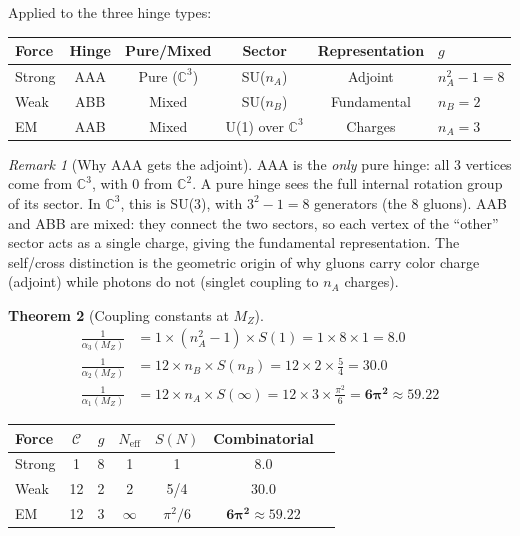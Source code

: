 \documentclass[12pt]{article}
\newtheorem{theorem}{Theorem}[section]
\theoremstyle{remark}
\newtheorem{remark}[theorem]{Remark}
\theoremstyle{definition}
\newcommand{\CC}{\mathbb{C}}
\begin{document}
Applied to the three hinge types:
\begin{center}
\begin{tabular}{lccccl}
\hline
Force & Hinge & Pure/Mixed & Sector & Representation & $g$ \\
\hline
Strong & AAA & Pure ($\CC^3$) & SU($n_A$) & Adjoint & $n_A^2 - 1 = 8$ \\
Weak & ABB & Mixed & SU($n_B$) & Fundamental & $n_B = 2$ \\
EM & AAB & Mixed & U(1) over $\CC^3$ & Charges & $n_A = 3$ \\
\hline
\end{tabular}
\end{center}

\begin{remark}[Why AAA gets the adjoint]
AAA is the \emph{only} pure hinge: all 3 vertices come from $\CC^3$, with 0 from $\CC^2$. A pure hinge sees the full internal rotation group of its sector. In $\CC^3$, this is SU(3), with $3^2 - 1 = 8$ generators (the 8 gluons). AAB and ABB are mixed: they connect the two sectors, so each vertex of the ``other'' sector acts as a single charge, giving the fundamental representation. The self/cross distinction is the geometric origin of why gluons carry color charge (adjoint) while photons do not (singlet coupling to $n_A$ charges).
\end{remark}

\begin{theorem}[Coupling constants at $M_Z$]
\label{thm:couplings}
\begin{align}
\frac{1}{\alpha_3(M_Z)} &= 1 \times (n_A^2 - 1) \times S(1) = 1 \times 8 \times 1 = \mathbf{8.0} \label{eq:alpha3} \\
\frac{1}{\alpha_2(M_Z)} &= 12 \times n_B \times S(n_B) = 12 \times 2 \times \frac{5}{4} = \mathbf{30.0} \label{eq:alpha2} \\
\frac{1}{\alpha_1(M_Z)} &= 12 \times n_A \times S(\infty) = 12 \times 3 \times \frac{\pi^2}{6} = \mathbf{6\pi^2} \approx 59.22 \label{eq:alpha1}
\end{align}
\end{theorem}

\begin{center}
\begin{tabular}{lcccccc}
\hline
Force & $\mathcal{C}$ & $g$ & $N_\text{eff}$ & $S(N)$ & Combinatorial \\
\hline
Strong & 1 & 8 & 1 & 1 & $\mathbf{8.0}$ \\
Weak & 12 & 2 & 2 & 5/4 & $\mathbf{30.0}$ \\
EM & 12 & 3 & $\infty$ & $\pi^2/6$ & $\mathbf{6\pi^2} \approx 59.22$ \\
\hline
\end{tabular}
\end{center}
\end{document}
